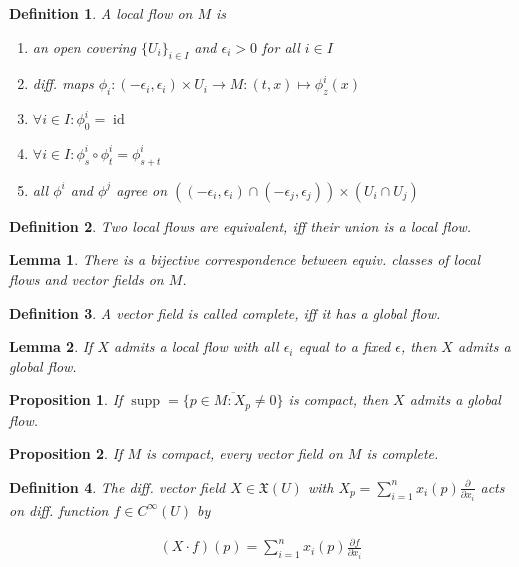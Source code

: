 \documentclass{scrartcl}
\newtheorem*{mydef}{Definition}
\newtheorem*{lemma}{Lemma}
\newtheorem*{prop}{Proposition}
\begin{document}
\begin{mydef}
  A \emph{local flow} on $M$ is

  \begin{enumerate}
  \item an open covering $\{U_i\}_{i\in I}$ and $\epsilon_i>0$ for all $i\in I$
  \item diff. maps $\phi_i:(-\epsilon_i,\epsilon_i)\times U_i \rightarrow M:(t,x)\mapsto \phi^i_z(x)$
  \item $\forall i\in I: \phi^i_0 = \operatorname{id}$
  \item $\forall i\in I: \phi^i_s\circ \phi^i_t = \phi^i_{s+t}$
  \item all $\phi^i$ and $\phi^j$ agree on $((-\epsilon_i,\epsilon_i)\cap(-\epsilon_j,\epsilon_j))\times(U_i\cap U_j)$
  \end{enumerate}
\end{mydef}

\begin{mydef}
  Two local flows are equivalent, iff their union is a local flow.
\end{mydef}

\begin{lemma}
  There is a bijective correspondence between equiv. classes of local flows and vector fields on $M$.
\end{lemma}

\begin{mydef}
  A vector field is called \emph{complete}, iff it has a global flow.
\end{mydef}

\begin{lemma}
  If $X$ admits a local flow with all $\epsilon_i$ equal to a fixed $\epsilon$, then $X$ admits a global flow.
\end{lemma}

\begin{prop}
  If $\operatorname{supp}=\overline{\{p\in M:X_p\ne 0\}}$ is compact, then $X$ admits a global flow.
\end{prop}

\begin{prop}
  If $M$ is compact, every vector field on $M$ is complete.
\end{prop}

\begin{mydef}
  The diff. vector field $X\in \mathfrak X(U)$ with $X_p=\sum_{i=1}^n x_i(p) \tfrac{\partial}{\partial x_i}$ acts on diff. function $f\in C^\infty(U)$ by

  \begin{align}
    (X\cdot f) (p) = \sum_{i=1}^n x_i(p) \frac{\partial f}{\partial x_i}
  \end{align}
\end{mydef}
\end{document}
